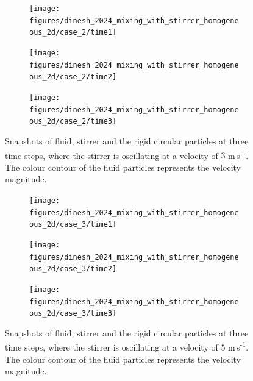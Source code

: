 \documentclass[preprint,12pt]{elsarticle}
\begin{document}
\begin{figure}[!htpb]
  \centering
  \begin{subfigure}{0.48\textwidth}
    \centering
    \texttt{[image: figures/dinesh\_2024\_mixing\_with\_stirrer\_homogeneous\_2d/case\_2/time1]}
    \label{fig:1-mixing-1-a}
  \end{subfigure}
  \begin{subfigure}{0.48\textwidth}
    \centering
    \texttt{[image: figures/dinesh\_2024\_mixing\_with\_stirrer\_homogeneous\_2d/case\_2/time2]}
    \label{fig:1-mixing-1-b}
  \end{subfigure}

  \begin{subfigure}{0.48\textwidth}
    \centering
    \texttt{[image: figures/dinesh\_2024\_mixing\_with\_stirrer\_homogeneous\_2d/case\_2/time3]}
    \label{fig:1-mixing-1-c}
  \end{subfigure}
  \caption{Snapshots of fluid, stirrer and the rigid circular particles at
    three time steps, where the stirrer is oscillating at a velocity of $3$
    m\,s\textsuperscript{-1}. The colour contour of the fluid particles
    represents the velocity magnitude.}
\label{fig:1-mixing-2}
\end{figure}
\begin{figure}[!htpb]
  \centering
  \begin{subfigure}{0.48\textwidth}
    \centering
    \texttt{[image: figures/dinesh\_2024\_mixing\_with\_stirrer\_homogeneous\_2d/case\_3/time1]}
    \label{fig:1-mixing-1-a}
  \end{subfigure}
  \begin{subfigure}{0.48\textwidth}
    \centering
    \texttt{[image: figures/dinesh\_2024\_mixing\_with\_stirrer\_homogeneous\_2d/case\_3/time2]}
    \label{fig:1-mixing-1-b}
  \end{subfigure}

  \begin{subfigure}{0.48\textwidth}
    \centering
    \texttt{[image: figures/dinesh\_2024\_mixing\_with\_stirrer\_homogeneous\_2d/case\_3/time3]}
    \label{fig:1-mixing-1-c}
  \end{subfigure}
  \caption{Snapshots of fluid, stirrer and the rigid circular particles at
    three time steps, where the stirrer is oscillating at a velocity of $5$
    m\,s\textsuperscript{-1}. The colour contour of the fluid particles
    represents the velocity magnitude.}
\label{fig:1-mixing-3}
\end{figure}
\end{document}
